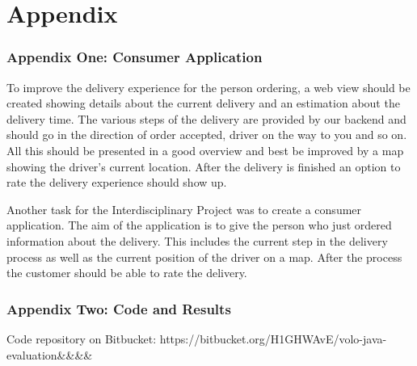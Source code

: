 \part*{Appendix}
\renewcommand{\thesection}{\arabic{section}}
\renewcommand{\theequation}{\arabic{equation}}
\section{Appendix One: Consumer Application}\label{section:Appendix One: Consumer Application}
To improve the delivery experience for the person ordering, a web view should be created showing details about the current delivery and an estimation about the delivery time. The various steps of the delivery are provided by our backend and should go in the direction of order accepted, driver on the way to you and so on. All this should be presented in a good overview and best be improved by a map showing the driver’s current location. After the delivery is finished an option to rate the delivery experience should show up.

Another task for the Interdisciplinary Project was to create a consumer application. The aim of the application is to give the person who just ordered information about the delivery. This includes the current step in the delivery process as well as the current position of the driver on a map. After the process the customer should be able to rate the delivery.



\newpage
\section{Appendix Two: Code and Results}\label{section:Appendix Two: Code and Results}

Code repository on Bitbucket:\newline
https://bitbucket.org/H1GHWAvE/volo-java-evaluation\&&\&&
